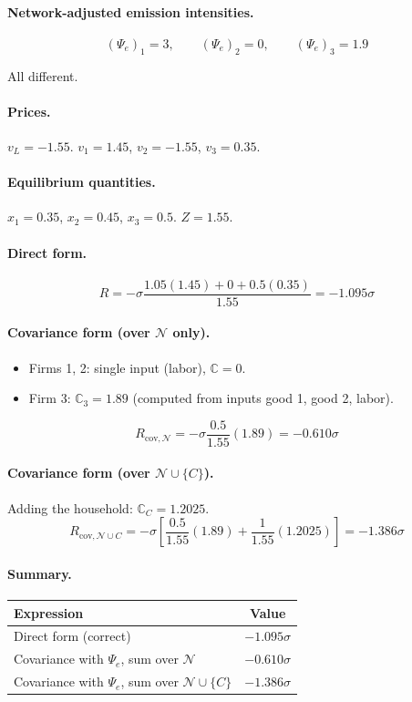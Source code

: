 \documentclass[11pt]{article}
\newcommand{\N}{\mathcal{N}}
\begin{document}
\paragraph{Network-adjusted emission intensities.}
$$(\Psi_e)_1 = 3, \qquad (\Psi_e)_2 = 0, \qquad (\Psi_e)_3 = 1.9$$

All different.

\paragraph{Prices.} $v_L = -1.55$. $v_1 = 1.45$, $v_2 = -1.55$, $v_3 = 0.35$.

\paragraph{Equilibrium quantities.}
$x_1 = 0.35$, $x_2 = 0.45$, $x_3 = 0.5$. $Z = 1.55$.

\paragraph{Direct form.}
$$R = -\sigma\frac{1.05(1.45) + 0 + 0.5(0.35)}{1.55} = -1.095\sigma$$

\paragraph{Covariance form (over $\N$ only).}
\begin{itemize}
    \item Firms 1, 2: single input (labor), $\mathbb{C} = 0$.
    \item Firm 3: $\mathbb{C}_3 = 1.89$ (computed from inputs good 1, good 2, labor).
\end{itemize}
$$R_{\text{cov},\N} = -\sigma \frac{0.5}{1.55}(1.89) = -0.610\sigma$$

\paragraph{Covariance form (over $\N \cup \{C\}$).}
Adding the household: $\mathbb{C}_C = 1.2025$.
$$R_{\text{cov}, \N \cup C} = -\sigma\left[\frac{0.5}{1.55}(1.89) + \frac{1}{1.55}(1.2025)\right] = -1.386\sigma$$

\paragraph{Summary.}

\begin{center}
\begin{tabular}{lc}
\toprule
Expression & Value \\
\midrule
Direct form (correct) & $-1.095\sigma$ \\
Covariance with $\Psi_e$, sum over $\N$ & $-0.610\sigma$ \\
Covariance with $\Psi_e$, sum over $\N \cup \{C\}$ & $-1.386\sigma$ \\
\bottomrule
\end{tabular}
\end{center}
\end{document}
